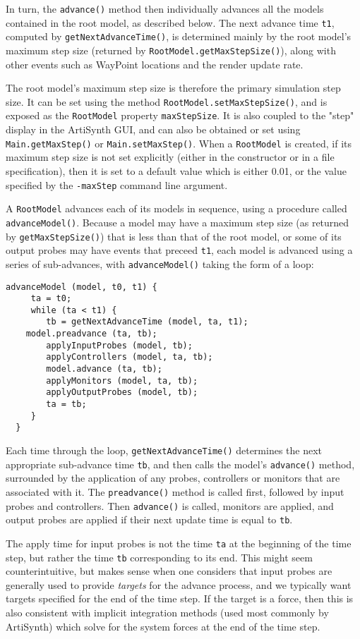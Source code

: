 \documentclass{article}
\begin{document}
In turn, the {\tt advance()} method then individually advances all the
models contained in the root model, as described below.  The next
advance time {\tt t1}, computed by {\tt getNextAdvanceTime()}, is
determined mainly by the root model's maximum step size (returned by
{\tt RootModel.getMaxStep\-Size()}), along with other events such as
WayPoint locations and the render update rate.

The root model's maximum step size is therefore the primary simulation
step size. It can be set using the method
{\tt RootModel.setMaxStepSize()}, and is exposed as the {\tt RootModel}
property {\tt maxStepSize}.  It is also coupled to the "step" display in
the ArtiSynth GUI, and can also be obtained or set using
{\tt Main.getMaxStep()} or {\tt Main.setMaxStep()}. When a {\tt RootModel} is
created, if its maximum step size is not set explicitly (either in the
constructor or in a file specification), then it is set to a default
value which is either 0.01, or the value specified by the {\tt -maxStep}
command line argument.

A {\tt RootModel} advances each of its models in sequence, using a
procedure called {\tt advanceModel()}. Because a model may have a
maximum step size (as returned by {\tt getMaxStepSize()}) that is less
than that of the root model, or some of its output probes may have
events that preceed {\tt t1}, each model is advanced using
a series of sub-advances, with {\tt advanceModel()} taking the
form of a loop:
\begin{lstlisting}[]
  advanceModel (model, t0, t1) {
     ta = t0;
     while (ta < t1) {
        tb = getNextAdvanceTime (model, ta, t1);
	model.preadvance (ta, tb);
        applyInputProbes (model, tb);
        applyControllers (model, ta, tb);
        model.advance (ta, tb);
        applyMonitors (model, ta, tb);
        applyOutputProbes (model, tb);
        ta = tb;
     }
  }
\end{lstlisting}
Each time through the loop, {\tt getNextAdvanceTime()} determines the
next appropriate sub-advance time {\tt tb}, and then calls the model's
{\tt advance()} method, surrounded by the application of any probes,
controllers or monitors that are associated with it.
The {\tt preadvance()} method is called first, followed
by input probes and controllers.
Then {\tt advance()} is called, monitors are applied, and
output probes are applied if their next update time is equal to
{\tt tb}.

\begin{sideblock}
The apply time for input probes is not the time {\tt ta}
at the beginning of the time step, but rather the time {\tt tb}
corresponding to its end. This might seem
counterintuitive, but makes sense when one considers that
input probes are generally used to provide {\it targets}
for the advance process, and we typically want targets
specified for the end of the time step. If the target is a force,
then this is also consistent with implicit integration methods (used
most commonly by ArtiSynth) which solve for the system forces
at the end of the time step.
\end{sideblock}
\end{document}
